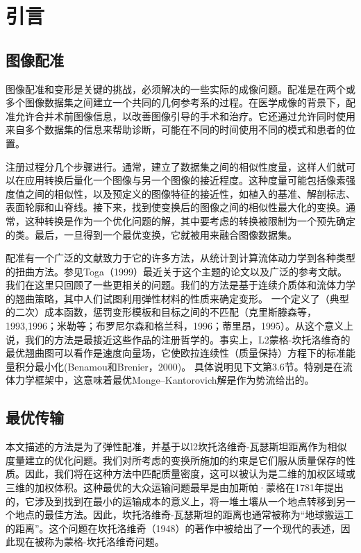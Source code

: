 \section{引言}\label{section : 1}

\subsection{图像配准}

图像配准和变形是关键的挑战，必须解决的一些实际的成像问题。配准是在两个或多个图像数据集之间建立一个共同的几何参考系的过程。在医学成像的背景下，配准允许合并术前图像信息，以改善图像引导的手术和治疗。它还通过允许同时使用来自多个数据集的信息来帮助诊断，可能在不同的时间使用不同的模式和患者的位置。

注册过程分几个步骤进行。通常，建立了数据集之间的相似性度量，这样人们就可以在应用转换后量化一个图像与另一个图像的接近程度。这种度量可能包括像素强度值之间的相似性，以及预定义的图像特征的接近性，如植入的基准、解剖标志、表面轮廓和山脊线。接下来，找到使变换后的图像之间的相似性最大化的变换。通常，这种转换是作为一个优化问题的解，其中要考虑的转换被限制为一个预先确定的类。最后，一旦得到一个最优变换，它就被用来融合图像数据集。

配准有一个广泛的文献致力于它的许多方法，从统计到计算流体动力学到各种类型的扭曲方法。参见Toga（1999）最近关于这个主题的论文以及广泛的参考文献。我们在这里只回顾了一些更相关的问题。我们的方法是基于连续介质体和流体力学的翘曲策略，其中人们试图利用弹性材料的性质来确定变形。
一个定义了（典型的二次）成本函数，惩罚变形模板和目标之间的不匹配（克里斯滕森等，1993,1996；米勒等；布罗尼尔森和格兰科，1996；蒂里昂，1995）。从这个意义上说，我们的方法是最接近这些作品的注册哲学的。事实上，L2蒙格-坎托洛维奇的最优翘曲图可以看作是速度向量场，它使欧拉连续性（质量保持）方程下的标准能量积分最小化(Benamou和Brenier，2000)。
具体说明见下文第3.6节。特别是在流体力学框架中，这意味着最优Monge–Kantorovich解是作为势流给出的。

\subsection{最优传输}

本文描述的方法是为了弹性配准，并基于以l2坎托洛维奇-瓦瑟斯坦距离作为相似度量建立的优化问题。我们对所考虑的变换所施加的约束是它们服从质量保存的性质。因此，我们将在这种方法中匹配质量密度，这可以被认为是二维的加权区域或三维的加权体积。这种最优的大众运输问题最早是由加斯帕·蒙格在1781年提出的，它涉及到找到在最小的运输成本的意义上，将一堆土壤从一个地点转移到另一个地点的最佳方法。因此，坎托洛维奇-瓦瑟斯坦的距离也通常被称为“地球搬运工的距离”。这个问题在坎托洛维奇（1948）的著作中被给出了一个现代的表述，因此现在被称为蒙格-坎托洛维奇问题。

